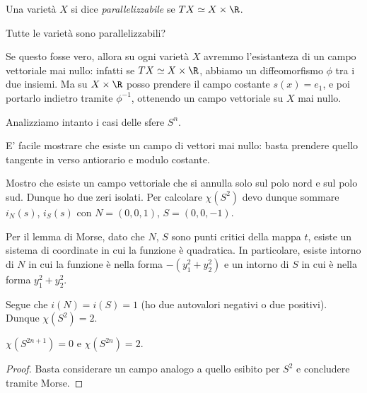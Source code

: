 
\begin{defn}
 Una varietà $X$ si dice \emph{parallelizzabile} se $TX\simeq X\times\R$.
\end{defn}
Tutte le varietà sono parallelizzabili?
\begin{oss}
 Se questo fosse vero, allora su ogni varietà $X$ avremmo l'esistanteza di un campo vettoriale mai nullo: infatti se $TX\simeq X\times\R$, abbiamo un diffeomorfismo $\phi$ tra i due insiemi.
 Ma su $X\times\R$ posso prendere il campo costante $s(x)=e_1$, e poi portarlo indietro tramite $\phi^{-1}$, ottenendo un campo vettoriale su $X$ mai nullo.

\end{oss}
Analizziamo intanto i casi delle sfere $S^n$.
\begin{es}[$S^1$]
 E' facile mostrare che esiste un campo di vettori mai nullo: basta prendere quello tangente in verso antiorario e modulo costante.
\end{es}
\begin{es}[$S^2$]
 Mostro che esiste un campo vettoriale che si annulla solo sul polo nord e sul polo sud.
 Dunque ho due zeri isolati. Per calcolare $\chi(S^2)$ devo dunque sommare $i_N(s)$, $i_S(s)$ con $N= (0,0,1)$, $S=(0,0,-1)$.
 \begin{oss} Per il lemma di Morse, dato che $N$, $S$ sono punti critici della mappa $t$, esiste un sistema di coordinate in cui la funzione è quadratica. 
 In particolare, esiste intorno di $N$ in cui la funzione è nella forma $-(y_1^2+y_2^2)$ e un intorno di $S$ in cui è nella forma $y_1^2+y_2^2$.
 \end{oss}
 Segue che $i(N)=i(S)=1$ (ho due autovalori negativi o due positivi).
 Dunque $\chi(S^2)=2$.
\end{es}
\begin{prop}
 $\chi(S^{2n+1})=0$ e $\chi(S^{2n})=2$.
 \end{prop}
 \begin{proof}
  Basta considerare un campo analogo a quello esibito per $S^{2}$ e concludere tramite Morse.
 \end{proof}

